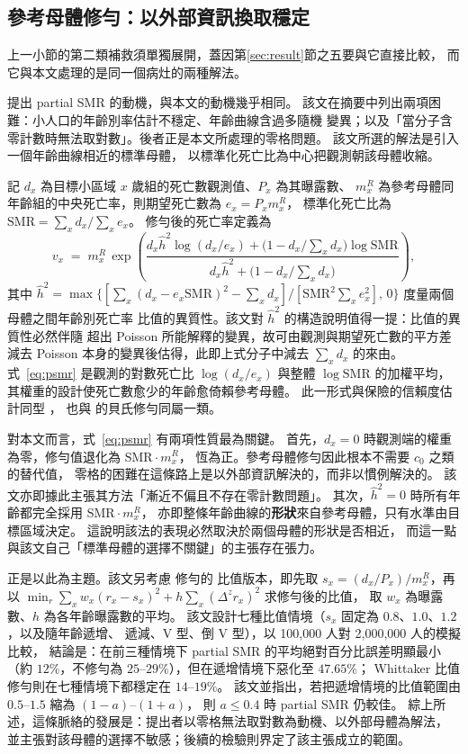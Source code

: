 \documentclass[UTF8, fontset=macnew, a4paper, 12pt]{ctexart}
\begin{document}
\subsection{參考母體修勻：以外部資訊換取穩定}\label{sec:ref}

上一小節的第二類補救須單獨展開，蓋因第\ref{sec:result}節之五要與它直接比較，
而它與本文處理的是同一個病灶的兩種解法。

\citet{lee2003} 提出 partial SMR 的動機，與本文的動機幾乎相同。
該文在摘要中列出兩項困難：小人口的年齡別率估計不穩定、年齡曲線含過多隨機
變異；以及「當分子含零計數時無法取對數」。後者正是本文所處理的零格問題。
該文所選的解法是引入一個年齡曲線相近的標準母體，
以標準化死亡比為中心把觀測朝該母體收縮。

記 $d_x$ 為目標小區域 $x$ 歲組的死亡數觀測值、$P_x$ 為其曝露數、
$m^R_x$ 為參考母體同年齡組的中央死亡率，則期望死亡數為 $e_x=P_x m^R_x$，
標準化死亡比為 $\mathrm{SMR}=\sum_x d_x\big/\sum_x e_x$。
修勻後的死亡率定義為
\begin{equation}\label{eq:psmr}
v_x \;=\; m^R_x\,\exp\!\left(
\frac{d_x\hat h^2\log(d_x/e_x)+\bigl(1-d_x/\textstyle\sum_x d_x\bigr)\log \mathrm{SMR}}
     {d_x\hat h^2+\bigl(1-d_x/\textstyle\sum_x d_x\bigr)}\right),
\end{equation}
其中 $\hat h^2=\max\bigl\{[\sum_x(d_x-e_x\mathrm{SMR})^2-\sum_x d_x]
\big/[\mathrm{SMR}^2\sum_x e_x^2],\,0\bigr\}$ 度量兩個母體之間年齡別死亡率
比值的異質性。該文對 $\hat h^2$ 的構造說明值得一提：比值的異質性必然伴隨
超出 Poisson 所能解釋的變異，故可由觀測與期望死亡數的平方差減去 Poisson
本身的變異後估得，此即上式分子中減去 $\sum_x d_x$ 的來由。
式~\eqref{eq:psmr} 是觀測的對數死亡比 $\log(d_x/e_x)$ 與整體
$\log\mathrm{SMR}$ 的加權平均，其權重的設計使死亡數愈少的年齡愈倚賴參考母體。
此一形式與保險的信賴度估計同型 \citep{klugman2012}，
也與 \citet{kimeldorf1967} 的貝氏修勻同屬一類。

對本文而言，式~\eqref{eq:psmr} 有兩項性質最為關鍵。
首先，$d_x=0$ 時觀測端的權重為零，修勻值退化為 $\mathrm{SMR}\cdot m^R_x$，
恆為正。參考母體修勻因此根本不需要 $c_0$ 之類的替代值，
零格的困難在這條路上是以外部資訊解決的，而非以慣例解決的。
該文亦即據此主張其方法「漸近不偏且不存在零計數問題」。
其次，$\hat h^2=0$ 時所有年齡都完全採用 $\mathrm{SMR}\cdot m^R_x$，
亦即整條年齡曲線的\textbf{形狀}來自參考母體，只有水準由目標區域決定。
這說明該法的表現必然取決於兩個母體的形狀是否相近，
而這一點與該文自己「標準母體的選擇不關鍵」的主張存在張力。

\citet{yue2019} 正是以此為主題。該文另考慮 \citet{whittaker1923} 修勻的
比值版本，即先取 $s_x=(d_x/P_x)/m^R_x$，再以
$\min_r \sum_x w_x(r_x-s_x)^2+h\sum_x(\Delta^z r_x)^2$ 求修勻後的比值，
取 $w_x$ 為曝露數、$h$ 為各年齡曝露數的平均。
該文設計七種比值情境（$s_x$ 固定為 $0.8$、$1.0$、$1.2$，以及隨年齡遞增、
遞減、V 型、倒 V 型），以 100,000 人對 2,000,000 人的模擬比較，
結論是：在前三種情境下 partial SMR 的平均絕對百分比誤差明顯最小
（約 $12\%$，不修勻為 $25$--$29\%$），但在遞增情境下惡化至 $47.65\%$；
Whittaker 比值修勻則在七種情境下都穩定在 $14$--$19\%$。
該文並指出，若把遞增情境的比值範圍由 $0.5$--$1.5$ 縮為 $(1-a)$--$(1+a)$，
則 $a\le 0.4$ 時 partial SMR 仍較佳。
綜上所述，這條脈絡的發展是：提出者以零格無法取對數為動機、以外部母體為解法，
並主張對該母體的選擇不敏感；後續的檢驗則界定了該主張成立的範圍。
\end{document}
